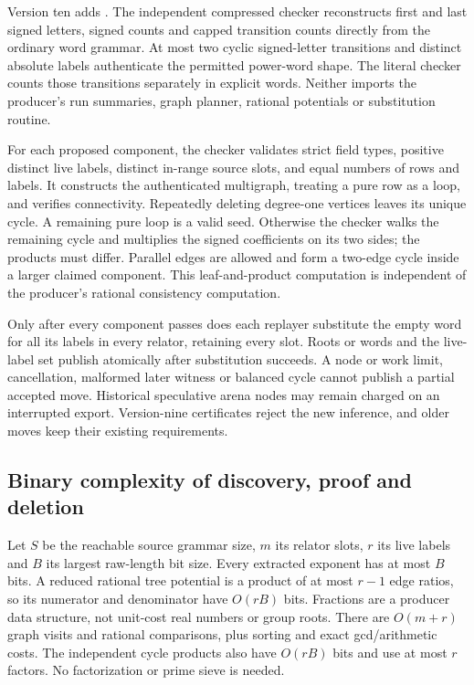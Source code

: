 Version ten adds . The independent compressed
checker reconstructs first and last signed letters, signed counts and capped
transition counts directly from the ordinary word grammar. At most two cyclic
signed-letter transitions and distinct absolute labels authenticate the
permitted power-word shape. The literal checker counts those transitions
separately in explicit words. Neither imports the producer's run summaries,
graph planner, rational potentials or substitution routine.

For each proposed component, the checker validates strict field types,
positive distinct live labels, distinct in-range source slots, and equal
numbers of rows and labels. It constructs the authenticated multigraph,
treating a pure row as a loop, and verifies connectivity. Repeatedly deleting
degree-one vertices leaves its unique cycle. A remaining pure loop is a valid
seed. Otherwise the checker walks the remaining cycle and multiplies the
signed coefficients on its two sides; the products must differ. Parallel
edges are allowed and form a two-edge cycle inside a larger claimed component.
This leaf-and-product computation is independent of the producer's rational
consistency computation.

Only after every component passes does each replayer substitute the empty
word for all its labels in every relator, retaining every slot. Roots or words
and the live-label set publish atomically after substitution succeeds. A node
or work limit, cancellation, malformed later witness or balanced cycle cannot
publish a partial accepted move. Historical speculative arena nodes may remain
charged on an interrupted export. Version-nine certificates reject the new
inference, and older moves keep their existing requirements.

\subsection{Binary complexity of discovery, proof and deletion}

Let $S$ be the reachable source grammar size, $m$ its relator slots, $r$ its
live labels and $B$ its largest raw-length bit size. Every extracted exponent
has at most $B$ bits. A reduced rational tree potential is a product of at most
$r-1$ edge ratios, so its numerator and denominator have $O(rB)$ bits. Fractions
are a producer data structure, not unit-cost real numbers or group roots.
There are $O(m+r)$ graph visits and rational comparisons, plus sorting and
exact gcd/arithmetic costs. The independent cycle products also have $O(rB)$
bits and use at most $r$ factors. No factorization or prime sieve is needed.

